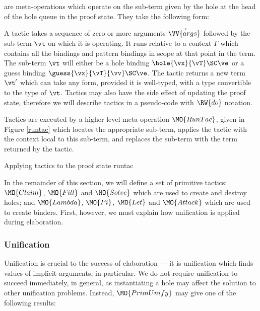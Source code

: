 \noindent
{} are meta-operations which operate on the sub-term given by the
hole at the head of the hole queue in the proof state. They take the following
form:


A tactic takes a sequence of zero or more arguments $\vec{\VV{args}}$ followed
by the sub-term $\vt$ on which it is operating. It runs relative to a context
$\Gamma$ which contains all the bindings and pattern bindings in scope at that
point in the term. The sub-term $\vt$ will either be a hole binding
$\hole{\vx}{\vT}\SC\ve$ or a guess binding $\guess{\vx}{\vT}{\vv}\SC\ve$. The
tactic returns a new term $\vt'$ which can take any form, provided it is
well-typed, with a type convertible to the type of $\vt$. 
Tactics may also have the side effect of updating the proof state,
therefore we will describe tactics in a pseudo-code with $\RW{do}$ notation.

Tactics are executed by a higher level meta-operation $\MO{RunTac}$, 
given in Figure \ref{runtac} which
locates the appropriate sub-term, applies the tactic with the context
local to this sub-term, and
replaces the sub-term with the term returned by the
tactic. 

{Applying tactics to the proof state}
{runtac}

In the remainder of this section, we will define a set of primitive tactics:
$\MO{Claim}$, $\MO{Fill}$ and $\MO{Solve}$ which are used to create and destroy
holes; and $\MO{Lambda}$, $\MO{Pi}$, $\MO{Let}$ and $\MO{Attack}$ which are
used to create binders. First, however, we must explain how unification is
applied during elaboration.

\subsubsection{Unification}

Unification is crucial to the success of elaboration --- it is unification
which finds values of implicit arguments, in particular. We do not require
unification to succeed immediately, in general, as instantiating a hole may 
affect the solution to other unification problems. Instead, 
$\MO{PrimUnify}$ may give one of the following results:

